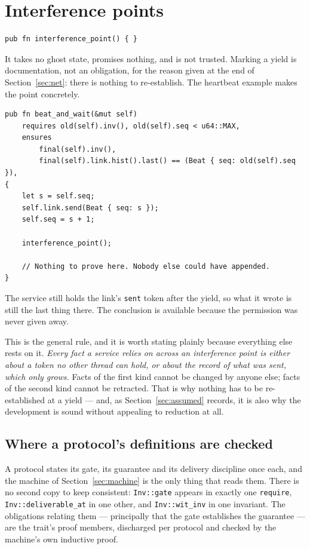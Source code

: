 \documentclass[11pt]{article}
\newcommand{\code}[1]{\texttt{#1}}
\newcommand{\srcname}[1]{%
  \vspace{0.9em}\noindent{\sffamily\scriptsize\color{comment}\MakeUppercase{#1}}\par
  \vspace{-0.7em}}
\begin{document}
\section{Interference points}\label{sec:yield}

\srcname{src/tok.rs}
\begin{lstlisting}
pub fn interference_point() { }
\end{lstlisting}

It takes no ghost state, promises nothing, and is not trusted. Marking a yield
is documentation, not an obligation, for the reason given at the end of
Section~\ref{sec:net}: there is nothing to re-establish. The heartbeat example
makes the point concretely.

\srcname{src/examples/heartbeat.rs}
\begin{lstlisting}
pub fn beat_and_wait(&mut self)
    requires old(self).inv(), old(self).seq < u64::MAX,
    ensures
        final(self).inv(),
        final(self).link.hist().last() == (Beat { seq: old(self).seq }),
{
    let s = self.seq;
    self.link.send(Beat { seq: s });
    self.seq = s + 1;

    interference_point();

    // Nothing to prove here. Nobody else could have appended.
}
\end{lstlisting}

The service still holds the link's \code{sent} token after the yield, so what it
wrote is still the last thing there. The conclusion is available because the
permission was never given away.

This is the general rule, and it is worth stating plainly because everything
else rests on it. \emph{Every fact a service relies on across an interference
point is either about a token no other thread can hold, or about the record of
what was sent, which only grows.} Facts of the first kind cannot be changed by
anyone else; facts of the second kind cannot be retracted. That is why nothing
has to be re-established at a yield --- and, as Section~\ref{sec:assumed}
records, it is also why the development is sound without appealing to reduction
at all.

\subsection*{Where a protocol's definitions are checked}\label{sec:coherence}

A protocol states its gate, its guarantee and its delivery discipline once each,
and the machine of Section~\ref{sec:machine} is the only thing that reads them.
There is no second copy to keep consistent: \code{Inv::gate} appears in exactly
one \code{require}, \code{Inv::deliverable\_at} in one other, and
\code{Inv::wit\_inv} in one invariant. The obligations relating them ---
principally that the gate establishes the guarantee --- are the trait's proof
members, discharged per protocol and checked by the machine's own inductive
proof.
\end{document}
